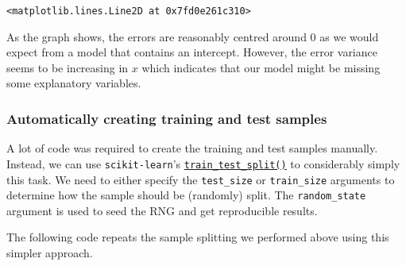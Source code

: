\documentclass{scrartcl}
\makeatletter
\newcommand{\boxspacing}{\kern\kvtcb@left@rule\kern\kvtcb@boxsep}
\newcommand{\prompt}[4]{
        {\ttfamily\llap{{\color{#2}[#3]:\hspace{3pt}#4}}\vspace{-\baselineskip}}
    }
\makeatother
\begin{document}
            \begin{tcolorbox}[breakable, size=fbox, boxrule=.5pt, pad at break*=1mm, opacityfill=0]
\prompt{Out}{outcolor}{11}{\boxspacing}
\begin{Verbatim}[commandchars=\\\{\}]
<matplotlib.lines.Line2D at 0x7fd0e261c310>
\end{Verbatim}
\end{tcolorbox}
        
    \begin{center}
    \end{center}
    
    As the graph shows, the errors are reasonably centred around \(0\) as we
would expect from a model that contains an intercept. However, the error
variance seems to be increasing in \(x\) which indicates that our model
might be missing some explanatory variables.

    \hypertarget{automatically-creating-training-and-test-samples}{%
\subsubsection*{Automatically creating training and test
samples}\label{automatically-creating-training-and-test-samples}}

A lot of code was required to create the training and test samples
manually. Instead, we can use \texttt{scikit-learn}'s
\href{https://scikit-learn.org/stable/modules/generated/sklearn.model_selection.train_test_split.html}{\texttt{train\_test\_split()}}
to considerably simply this task. We need to either specify the
\texttt{test\_size} or \texttt{train\_size} arguments to determine how
the sample should be (randomly) split. The \texttt{random\_state}
argument is used to seed the RNG and get reproducible results.

The following code repeats the sample splitting we performed above using
this simpler approach.
\end{document}
